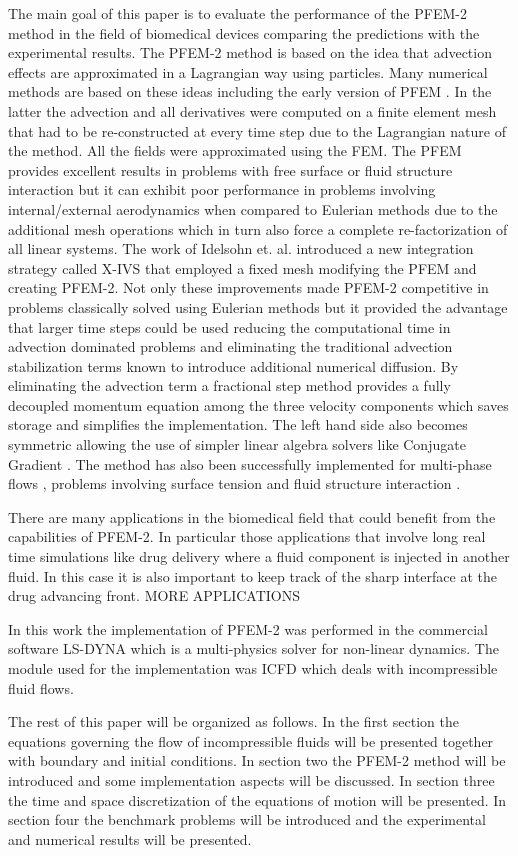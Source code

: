 The main goal of this paper is to evaluate the performance of the PFEM-2 method in the field of biomedical devices comparing the predictions with the experimental results. The PFEM-2 method is based on the idea that advection effects are approximated in a Lagrangian way using particles. Many numerical methods are based on these ideas \cite{sph,pic,mac,mps,mpm} including the early version of PFEM \cite{sergio:pfem}. In the latter the advection and all derivatives were computed on a finite element mesh that had to be re-constructed at every time step due to the Lagrangian nature of the method. All the fields were approximated using the FEM. The PFEM provides excellent results in problems with free surface or fluid structure interaction but it can exhibit poor performance in problems involving internal/external aerodynamics when compared to Eulerian methods due to the additional mesh operations which in turn also force a complete re-factorization of all linear systems. The work of Idelsohn et. al. \cite{sergio:xivs1,sergio:xivs2} introduced a new integration strategy called X-IVS that employed a fixed mesh modifying the PFEM and creating PFEM-2. Not only these improvements made PFEM-2 competitive in problems classically solved using Eulerian methods but it provided the advantage that larger time steps could be used \cite{gimenez:parallel} reducing the computational time in advection dominated problems and eliminating the traditional advection stabilization terms known to introduce additional numerical diffusion. By eliminating the advection term a fractional step method provides a fully decoupled momentum equation among the three velocity components which saves storage and simplifies the implementation. The left hand side also becomes symmetric allowing the use of simpler linear algebra solvers like Conjugate Gradient \cite{conjgrad}. The method has also been successfully implemented for multi-phase flows \cite{sergio:pfem2_lts,gimenez:fs,gimenez:tesis}, problems involving surface tension \cite{gimenez:st} and fluid structure interaction \cite{pablo:FSI}.

There are many applications in the biomedical field that could benefit from the capabilities of PFEM-2. In particular those applications that involve long real time simulations like drug delivery where a fluid component is injected in another fluid. In this case it is also important to keep track of the sharp interface at the drug advancing front. {MORE APPLICATIONS}

In this work the implementation of PFEM-2 was performed in the commercial software LS-DYNA\textsuperscript{\textregistered} which is a multi-physics solver for non-linear dynamics. The module used for the implementation was ICFD which deals with incompressible fluid flows. 

The rest of this paper will be organized as follows. 
In the first section the equations governing the flow of incompressible fluids will be presented together with boundary and initial conditions. 
In section two the PFEM-2 method will be introduced and some implementation aspects will be discussed.
In section three the time and space discretization of the equations of motion will be presented. 
In section four the benchmark problems will be introduced and the experimental and numerical results will be presented.
